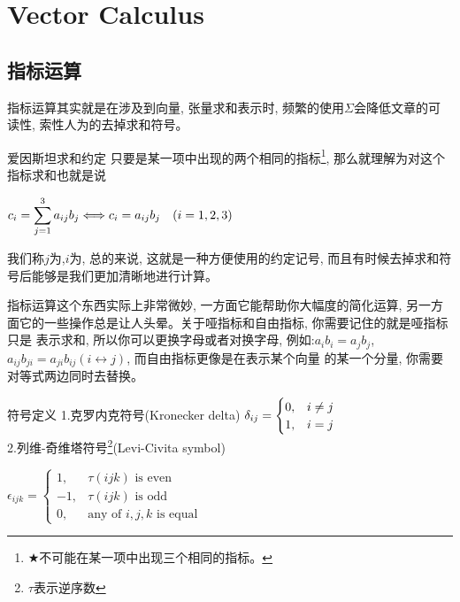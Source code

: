 \appendix
\renewcommand{\thechapter}{\Alph{chapter}}
\chapter{Vector Calculus}
\section{指标运算}
指标运算其实就是在涉及到向量, 张量求和表示时, 频繁的使用$\Sigma$会降低文章的可读性, 索性人为的去掉求和符号。
\begin{proposition}{爱因斯坦求和约定}
    只要是某一项中出现的两个相同的指标\footnote{$\bigstar$不可能在某一项中出现三个相同的指标。}, 那么就理解为对这个指标求和也就是说
    \begin{center}
        \begin{math}
            \displaystyle
            c_i = \sum_{j=1}^{3}a_{ij}b_{j} \Longleftrightarrow c_i=a_{ij}b_{j} \text{\quad} (i=1,2,3)
        \end{math}
    \end{center}
    我们称$j$为,$i$为, 总的来说, 这就是一种方便使用的约定记号, 而且有时候去掉求和符号后能够是我们更加清晰地进行计算。
\end{proposition}
指标运算这个东西实际上非常微妙, 一方面它能帮助你大幅度的简化运算, 另一方面它的一些操作总是让人头晕。关于哑指标和自由指标, 你需要记住的就是哑指标只是
表示求和, 所以你可以更换字母或者对换字母, 例如:$a_ib_i=a_jb_j$, $a_{ij}b_{ji}=a_{ji}b_{ij}(i\leftrightarrow j)$, 而自由指标更像是在表示某个向量
的某一个分量, 你需要对等式两边同时去替换。
\begin{define}{符号定义}
    1.克罗内克符号(Kronecker delta)\qquad\qquad
    \begin{math}
        \centering
        \delta_{ij}=\begin{cases}
            0,& i \neq j\\
            1,& i=j
        \end{cases}
    \end{math}\\
    2.列维-奇维塔符号\footnote{$\tau$表示逆序数}(Levi-Civita symbol)\\
    \begin{center}
    \begin{math}
        \epsilon_{ijk}=\begin{cases}
            1,&\tau(ijk)\text{ is even}\\
            -1,&\tau(ijk)\text{ is odd}\\
            0,&\text{any of $i,j,k$ is equal}
        \end{cases}
    \end{math} 
    \end{center}
\end{define}    
